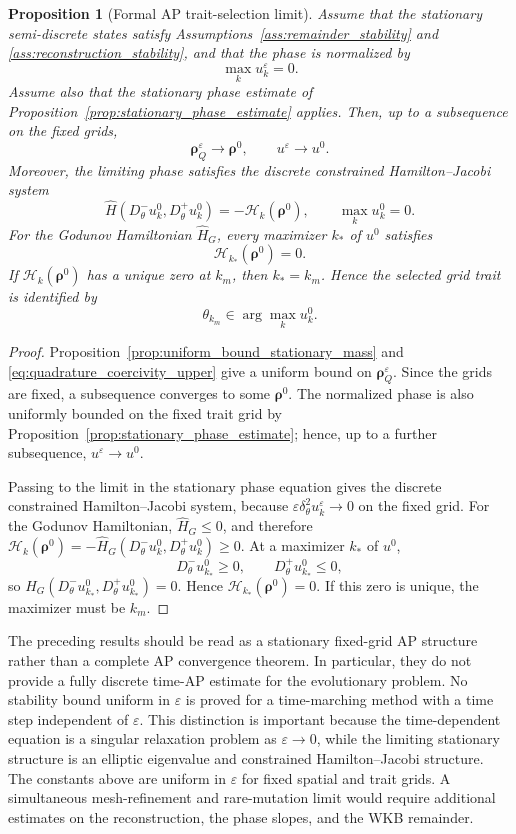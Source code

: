 \documentclass[11pt]{article}
\newtheorem{proposition}{Proposition}[section]
\begin{document}
\begin{proposition}[Formal AP trait-selection limit]
\label{prop:formal_AP_trait_selection}
Assume that the stationary semi-discrete states satisfy
Assumptions~\ref{ass:remainder_stability} and
\ref{ass:reconstruction_stability}, and that the phase is normalized by
\[
    \max_k u_k^\varepsilon=0 .
\]
Assume also that the stationary phase estimate of
Proposition~\ref{prop:stationary_phase_estimate} applies. Then, up to a
subsequence on the fixed grids,
\[
    \boldsymbol\rho_Q^\varepsilon\to \boldsymbol\rho^0,
    \qquad
    u^\varepsilon\to u^0 .
\]
Moreover, the limiting phase satisfies the discrete constrained
Hamilton--Jacobi system
\[
    \widehat H
    \left(
        D_\theta^-u_k^0,
        D_\theta^+u_k^0
    \right)
    =
    -\mathcal H_k(\boldsymbol\rho^0),
    \qquad
    \max_k u_k^0=0 .
\]
For the Godunov Hamiltonian \(\widehat H_G\), every maximizer \(k_*\) of
\(u^0\) satisfies
\[
    \mathcal H_{k_*}(\boldsymbol\rho^0)=0 .
\]
If \(\mathcal H_k(\boldsymbol\rho^0)\) has a unique zero at \(k_m\), then
\(k_*=k_m\). Hence the selected grid trait is identified by
\[
    \theta_{k_m}\in \arg\max_k u_k^0 .
\]
\end{proposition}

\begin{proof}
Proposition~\ref{prop:uniform_bound_stationary_mass} and
\eqref{eq:quadrature_coercivity_upper} give a uniform bound on
\(\boldsymbol\rho_Q^\varepsilon\). Since the grids are fixed, a subsequence
converges to some \(\boldsymbol\rho^0\). The normalized phase is also uniformly
bounded on the fixed trait grid by
Proposition~\ref{prop:stationary_phase_estimate}; hence, up to a further
subsequence, \(u^\varepsilon\to u^0\).

Passing to the limit in the stationary phase equation gives the discrete
constrained Hamilton--Jacobi system, because
\(\varepsilon\delta_\theta^2u_k^\varepsilon\to0\) on the fixed grid. For the
Godunov Hamiltonian, \(\widehat H_G\le0\), and therefore
\(
\mathcal H_k(\boldsymbol\rho^0)=-\widehat H_G(D_\theta^-u_k^0,D_\theta^+u_k^0)
\ge0
\).
At a maximizer \(k_*\) of \(u^0\),
\[
    D_\theta^-u_{k_*}^0\ge0,
    \qquad
    D_\theta^+u_{k_*}^0\le0,
\]
so \(\widehat H_G(D_\theta^-u_{k_*}^0,D_\theta^+u_{k_*}^0)=0\). Hence
\(\mathcal H_{k_*}(\boldsymbol\rho^0)=0\). If this zero is unique, the maximizer
must be \(k_m\).
\end{proof}


{
\color{red}
The preceding results should be read as a stationary fixed-grid AP structure rather than a complete AP convergence theorem. In particular, they do not provide a fully discrete time-AP estimate for the evolutionary problem. No stability bound uniform in \(\varepsilon\) is proved for a time-marching method with a time step independent of \(\varepsilon\). This distinction is important because the time-dependent equation is a singular relaxation problem as \(\varepsilon\to0\), while the limiting stationary structure is an elliptic eigenvalue and constrained Hamilton--Jacobi structure. The constants above are uniform in \(\varepsilon\) for fixed spatial and trait grids. A simultaneous mesh-refinement and rare-mutation limit would require additional estimates on the reconstruction, the phase slopes, and the WKB remainder.
}
\end{document}

